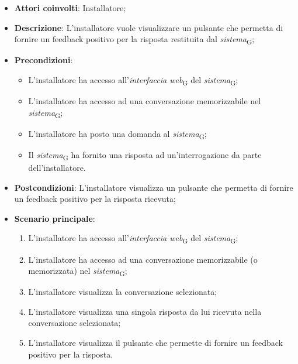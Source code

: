\begin{itemize}
    \item \textbf{Attori coinvolti}: Installatore;
    \item \textbf{Descrizione}: L'installatore vuole visualizzare un pulsante che permetta di fornire un feedback positivo per la risposta restituita dal \textit{sistema}\textsubscript{G};
    \item \textbf{Precondizioni}: 
    \begin{itemize}
        \item L’installatore ha accesso all’\textit{interfaccia web}\textsubscript{G} del \textit{sistema}\textsubscript{G};
        \item L’installatore ha accesso ad una conversazione memorizzabile nel \textit{sistema}\textsubscript{G};
        \item L'installatore ha posto una domanda al \textit{sistema}\textsubscript{G};
        \item Il \textit{sistema}\textsubscript{G} ha fornito una risposta ad un’interrogazione da parte dell’installatore.
    \end{itemize}
    \item \textbf{Postcondizioni}: L'installatore visualizza un pulsante che permetta di fornire un feedback positivo per la risposta ricevuta;
    \item \textbf{Scenario principale}:
    \begin{enumerate}
        \item L’installatore ha accesso all’\textit{interfaccia web}\textsubscript{G} del \textit{sistema}\textsubscript{G};
        \item L’installatore ha accesso ad una conversazione memorizzabile (o memorizzata) nel \textit{sistema}\textsubscript{G};
        \item L'installatore visualizza la conversazione selezionata;
        \item L'installatore visualizza una singola risposta da lui ricevuta nella conversazione selezionata;
        \item L'installatore visualizza il pulsante che permette di fornire un feedback positivo per la risposta.
    \end{enumerate}
\end{itemize}

